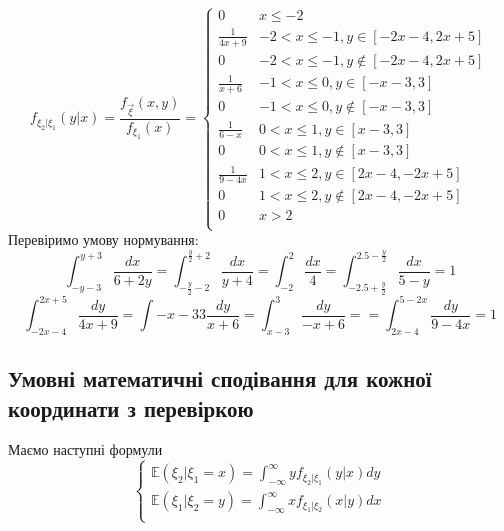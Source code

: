 \documentclass{article}
\begin{document}
	\[
		f_{\xi_2\vert \xi_1}(y\vert x) = \frac{f_{\overrightarrow{\xi}}(x, y)}{f_{\xi_1}(x)} = 
		\begin{cases}
			0 & x \leq -2 \\
			\frac{1}{4x+9} & -2 < x \leq -1, y \in [-2x-4, 2x+5] \\
			0 & -2 < x \leq -1, y \notin [-2x-4, 2x+5] \\
			\frac{1}{x+6} & -1 < x \leq 0, y \in [-x -3, 3] \\
			0 & -1 < x \leq 0, y \notin [-x -3, 3] \\
			\frac{1}{6-x} & 0 < x \leq 1, y \in [x - 3, 3] \\
			0 &  0 < x \leq 1, y \notin [x - 3, 3] \\
			\frac{1}{9-4x} & 1 < x \leq 2, y \in [2x-4, -2x+5] \\
			0 &  1 < x \leq 2, y \notin [2x-4, -2x+5] \\
			0 & x > 2 \\		
		\end{cases}
	\]
	Перевіримо умову нормування:
	\[
	\int_{-y-3}^{y+3} \frac{dx}{6+2y} = \int_{-\frac{y}{2}-2}^{\frac{y}{2}+2} \frac{dx}{y+4} = 
	\int_{-2}^2 \frac{dx}{4} = \int_{-2.5 + \frac{y}{2}}^{ 2.5 - \frac{y}{2}} \frac{dx}{5-y} = 1
	\]
	\bigskip
	\[
	\int_{-2x-4}^{2x+5} \frac{dy}{4x+9} = \int{-x-3}{3}\frac{dy}{x+6} = \int_{x-3}^3\frac{dy}{-x+6} = 
	= \int_{2x-4}^{5-2x}\frac{dy}{9-4x} = 1
	\]
	\subsection{Умовні математичні сподівання для кожної координати з перевіркою}
	
	Маємо наступні формули 
	\[
		\begin{cases}
		\mathbb{E} (\xi_2\vert \xi_1=x) = \int_{-\infty}^{\infty} y f_{\xi_2\vert \xi_1}(y\vert x) dy \\
		\mathbb{E}(\xi_1 \vert \xi_2=y) = \int_{-\infty}^{\infty} x	f_{\xi_1\vert \xi_2}(x\vert y) dx \\
		\end{cases}
	\]
	
\end{document}
